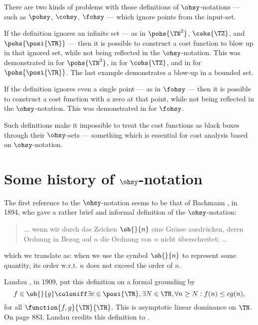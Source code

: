 \documentclass[b5paper, english, oneside]{memoir}
\begin{document}
\begin{note}
There are two kinds of problems with those definitions of $\ohsy$-notations --- such as $\pohsy$, $\cohsy$, $\fohsy$ --- which ignore points from the input-set.

If the definition ignores an infinite set --- as in $\pohs{\TN^2}$, $\cohs{\TZ}$, and $\pohs{\posi{\TR}}$ --- then it is possible to construct a cost function to blow up in that ignored set, while not being reflected in the $\ohsy$-notation. This was demonstrated in  for $\pohs{\TN^2}$, in  for $\cohs{\TZ}$, and in  for $\pohs{\posi{\TR}}$. The last example demonstrates a blow-up in a bounded set.

If the definition ignores even a single point --- as in $\fohsy$ --- then it is possible to construct a cost function with a zero at that point, while not being reflected in the $\ohsy$-notation. This was demonstrated in  for $\fohsy$.

Such definitions make it impossible to treat the cost functions as black boxes through their $\ohsy$-sets --- something which is essential for cost analysis based on $\ohsy$-notation.
\end{note}





\section{Some history of \texorpdfstring{$\ohsy$}{O}-notation}
\label{History}

The first reference to the $\ohsy$-notation seems to be that of Bachmann \cite[page 401]{BachmannOh}, in 1894, who gave a rather brief and informal definition of the $\ohsy$-notation:
\begin{quote}
... wenn wir durch das Zeichen $\oh{}{n}$ eine Gr\"osse ausdr\"ucken, deren Ordnung in Bezug auf $n$ die Ordnung von $n$ nicht \"uberschreitet; ...
\end{quote}
which we translate as: when we use the symbol $\oh{}{n}$ to represent some quantity, its order w.r.t. $n$ does not exceed the order of $n$. 

Landau \cite[page 31]{SmallOh}, in 1909, put this definition on a formal grounding by
\begin{equation}
\label{LandauAsymptotic}
f \in \oh{}{g} \coloniff \exists c \in \posi{\TR}, \exists N \in \TN, \forall n \geq N: f(n) \leq cg(n),
\end{equation}
for all $\function{f, g}{\TN}{\TR}$. This is asymptotic linear dominance on $\TN$. On page 883, Landau credits this definition to \cite{BachmannOh}. 
\end{document}
